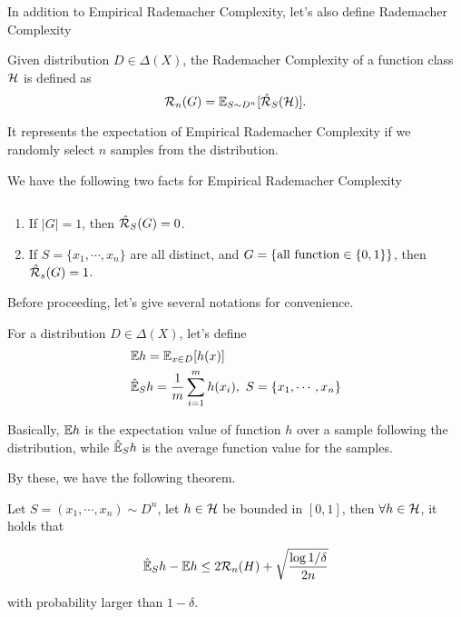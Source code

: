 \documentclass[../main.tex]{subfiles}
\begin{document}
	In addition to Empirical Rademacher Complexity, let's also define Rademacher Complexity
	
	\begin{definition}
		Given distribution $D\in \Delta(X)$, the Rademacher Complexity of a function class $\mathcal{H}$ is defined as
			\begin{equation}
				\mathcal{R}_n(G) = \mathbb{E}_{S \sim D^n} [\hat{\mathcal{R}}_S(\mathcal{H}) ].
			\end{equation}
	\end{definition}

	It represents the expectation of Empirical Rademacher Complexity if we randomly select $n$ samples from the distribution.
	
	We have the following two facts for Empirical Rademacher Complexity
	
	\begin{fact} $ $
		
		\begin{enumerate}
			\item If $|G| = 1$, then $\hat{\mathcal{R}}_S(G) = 0$.
			\item If $S = \{x_1,\cdots, x_n\}$ are all distinct, and $G = \{\textmd{all function}\in \{0,1\}\}$, then $\hat{\mathcal{R}}_s(G) = 1$.
		\end{enumerate}
	\end{fact} 

	Before proceeding, let's give several notations for convenience.
	
	\begin{notation}
		For a distribution $D \in \Delta(X)$, let's define
		\begin{equation}
			\begin{aligned}
				& \mathbb{E} h = \mathbb{E}_{x\in D}[h(x)] \\
				&\hat{\mathbb{E}}_S h = \frac{1}{m} \sum\limits_{i=1}^m h(x_i), \ S =\{x_1, \cdots, x_n\}
			\end{aligned}
		\end{equation}
	\end{notation}

	Basically, $\mathbb{E} h$ is the expectation value of function $h$ over a sample following the distribution, while $\hat{\mathbb{E}}_S h$ is the average function value for the samples.
	
	By these, we have the following theorem.
	
	\begin{theorem}\label{symmetric_lemma}
		
		Let $S = (x_1,\cdots, x_n) \sim D^n$, let $h \in \mathcal{H}$ be bounded in $[0,1]$, then $\forall h\in \mathcal{H}$, it holds that 
		
		\begin{equation}
			\hat{\mathbb{E}}_S h - \mathbb{E} h  \leq 2 \mathcal{R}_n(H) + \sqrt{\frac{\log 1 / \delta}{2n}}
		\end{equation}
		
		with probability larger than $1-\delta$.
	\end{theorem}
\end{document}
